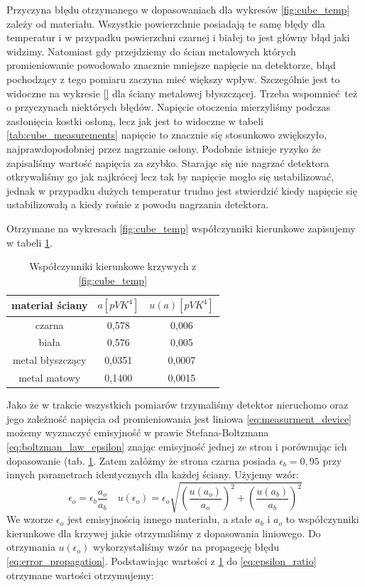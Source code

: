 \documentclass[12pt]{article}
\begin{document}
Przyczyna błędu otrzymanego w dopasowaniach dla wykresów \ref{fig:cube_temp} zależy od materiału. Wszystkie powierzchnie posiadają te samę błędy dla temperatur i w przypadku powierzchni czarnej i białej to jest główny błąd jaki widzimy.
Natomiast gdy przejdziemy do ścian metalowych których promieniowanie powodowało znacznie mniejsze napięcie na detektorze, błąd pochodzący z tego pomiaru zaczyna mieć większy wpływ. Szczególnie jest to widoczne na wykresie \ref{} dla ściany metalowej błyszczącej.
Trzeba wspomnieć też o przyczynach niektórych błędów. Napięcie otoczenia mierzyliśmy podczas zasłonięcia kostki osłoną, lecz jak jest to widoczne w tabeli \ref{tab:cube_measurements} napięcie to znacznie się stosunkowo zwiększyło, najprawdopodobniej przez nagrzanie osłony.
Podobnie istnieje ryzyko że zapisaliśmy wartość napięcia za szybko. Starając się nie nagrzać detektora otkrywaliśmy go jak najkrócej lecz tak by napięcie mogło się ustabilizować, jednak w przypadku dużych temperatur trudno jest stwierdzić kiedy napięcie się ustabilizowałą a kiedy rośnie z powodu nagrzania detektora.

Otrzymane na wykresach \ref{fig:cube_temp} współczynniki kierunkowe zapisujemy w tabeli \ref{tab:cube_line}.
\begin{table}[H]
    \centering
    \begin{tabular}{c|cc}
        \toprule
        materiał ściany & $a [pVK^4]$ & $u(a) [pVK^4]$ \\
        \midrule
        czarna & 0{,}578 & 0{,}006 \\
        biała & 0{,}576 & 0{,}005 \\
        metal błyszczący  & 0{,}0351 & 0{,}0007 \\
        metal matowy & 0{,}1400 & 0{,}0015 \\
        \bottomrule
    \end{tabular}
    \caption{Współczynniki kierunkowe krzywych z \ref{fig:cube_temp}}
    \label{tab:cube_line}
\end{table}

Jako że w trakcie wszystkich pomiarów trzymaliśmy detektor nieruchomo oraz jego zależność napięcia od promieniowania jest liniowa \eqref{eq:measurment_device} możemy wyznaczyć emisyjność w prawie Stefana-Boltzmana \eqref{eq:boltzman_law_epsilon} znając emisyjność jednej ze stron i porównując ich dopasowanie (tab. \ref{tab:cube_line}.
Zatem załóżmy że strona czarna posiada $\epsilon_b = 0{,}95$ przy innych parametrach identycznych dla każdej ściany. Użyjemy wzór:
\begin{equation}
    \epsilon_o = \epsilon_b \frac{a_o}{a_b} \quad u(\epsilon_o) = \epsilon_o \sqrt{(\frac{u(a_o)}{a_o})^2 + (\frac{u(a_b)}{a_b})^2}
    \label{eq:epsilon_ratio}
\end{equation}
We wzorze $\epsilon_o$ jest emisyjnością innego materiału, a stałe $a_b$ i $a_o$ to współczynniki kierunkowe dla krzywej jakie otrzymaliśmy z dopasowania liniowego. Do otrzymania $u(\epsilon_o)$ wykorzystaliśmy wzór na propagecję błędu \eqref{eq:error_propagation}.
Podstawiając wartości z \ref{tab:cube_line} do \eqref{eq:epsilon_ratio} otrzymane wartości otrzymujemy:
\end{document}
